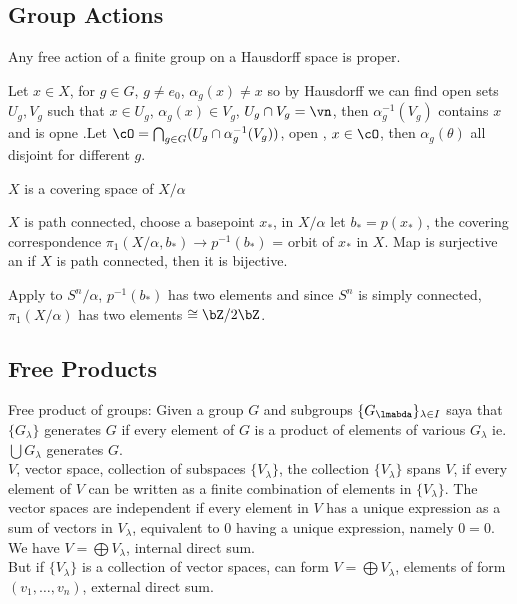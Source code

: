 
\subsection{Group Actions}

\begin{proposition}
    Any free action of a finite group on a Hausdorff space is proper. 
\end{proposition}

\begin{pf}
    Let $ x \in X$, for $g \in G$, $g \neq e_0$, $\alpha_g(x) \neq x$ so by Hausdorff we can find open sets $U_g, V_g$ such that $x \in U_g$, $\alpha_g(x) \in V_g$, $U_g \cap V_g = \vn$, then $\alpha_g^{-1}(V_g)$ contains $x$ and is opne .Let $\cO = \bigcap_{g \in G} (U_g \cap \alpha_g^{-1}(V_g))$, open , $x \in \cO$, then $\alpha_g(\theta)$ all disjoint for different $g$. 
\end{pf}

\begin{corollary}
    $X$ is a covering space of $X/\alpha$ 
\end{corollary}

\begin{pf}
    $X$ is path connected, choose a basepoint $x_*$, in $X/\alpha$ let $b_* = p(x_*)$, the covering correspondence $\pi_1(X/\alpha, b_*) \to p^{-1}(b_*)$ = orbit of $x_*$ in $X$. Map is surjective an if $X$ is path connected, then it is bijective. 
\end{pf}

\noindent
Apply to $S^n/\alpha$, $p^{-1}(b_*)$ has two elements and since $S^n$ is simply connected, $\pi_1(X/\alpha)$ has two elements $\cong \bZ/2\bZ$. 

\subsection{Free Products} 

Free product of groups: Given a group $G$ and subgroups $\{G_{\lmabda}\}_{\lambda \in I}$ saya that $\{G_{\lambda}\}$ generates $G$ if every element of $G$ is a product of elements of various $G_{\lambda}$ ie. $\bigcup G_{\lambda}$ generates $G$. \\

\noindent
$V$, vector space, collection of subspaces $\{V_{\lambda}\}$, the collection $\{V_{\lambda}\}$ spans $V$, if every element of $V$ can be written as a finite combination of elements in $\{V_{\lambda}\}$. The vector spaces are independent if every element in $V$ has a unique expression as a sum of vectors in $V_{\lambda}$, equivalent to 0 having a unique expression, namely $0=0$. We have $V = \bigoplus V_{\lambda}$, internal direct sum. \\
But if $\{V_{\lambda}\}$ is a collection of vector spaces, can form $V = \bigoplus V_{\lambda}$, elements of form $(v_1, \ldots, v_n)$, external direct sum. \\

